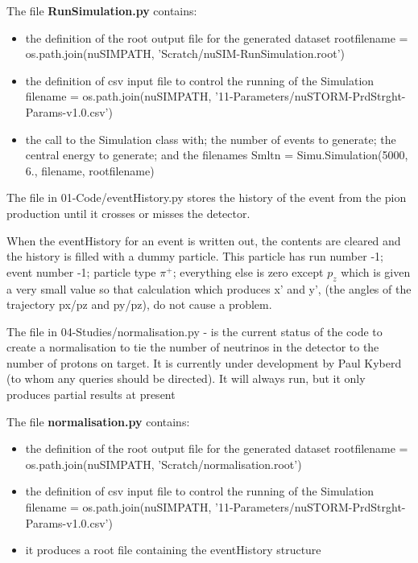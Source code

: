 \noindent The file {\bf RunSimulation.py} contains:
\begin{itemize}
\item the definition of the root output file for the generated dataset \newline
rootfilename = os.path.join(nuSIMPATH, 'Scratch/nuSIM-RunSimulation.root')
\item the definition of csv  input file to control the running of the Simulation \newline
filename  = os.path.join(nuSIMPATH, '11-Parameters/nuSTORM-PrdStrght-Params-v1.0.csv')
\item the call to the Simulation class with; the number of events to generate; the central energy to generate; and the filenames\newline
Smltn = Simu.Simulation(5000, 6., filename, rootfilename)
\end{itemize}
\hfill\newline

The file in 01-Code/eventHistory.py stores the history of the event from the pion production until it crosses
or misses the detector.

When the eventHistory for an event is written out, the contents are cleared and the history is filled
with a dummy particle. This particle has run number -1; event number -1; particle type $\pi^+$; everything
else is zero except $p_z$ which is  given a very small value so that calculation which produces x' and y', (the angles
of the trajectory px/pz and py/pz), do not cause a problem.

The file in 04-Studies/normalisation.py - is the current status of the code to create a normalisation 
to tie the number of neutrinos in the detector to the number of protons on target.
It is currently under development by Paul Kyberd (to whom any queries should be directed). It will always run, but it only produces partial results at present\newline

\noindent The file {\bf normalisation.py} contains:
\begin{itemize}
\item the definition of the root output file for the generated dataset \newline
rootfilename = os.path.join(nuSIMPATH, 'Scratch/normalisation.root')
\item the definition of csv  input file to control the running of the Simulation \newline
filename  = os.path.join(nuSIMPATH, '11-Parameters/nuSTORM-PrdStrght-Params-v1.0.csv')
\item it produces a root file containing the eventHistory structure
\end{itemize}

